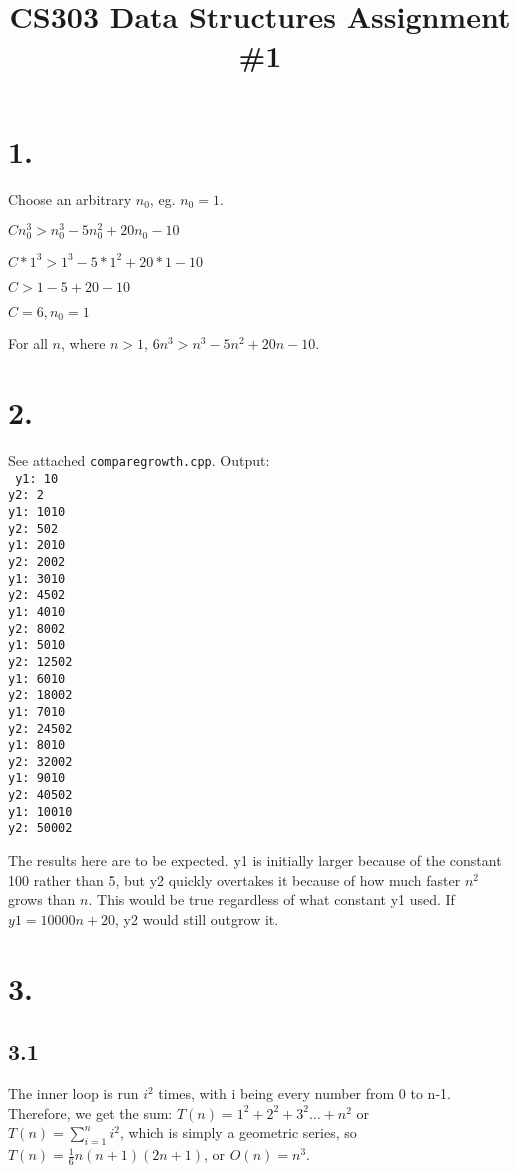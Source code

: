 \documentclass[12pt]{article}
\title{CS303 Data Structures Assignment \#1}
\begin{document}
\maketitle

\section*{1.}
{\small
Choose an arbitrary \(n_0\), eg. \(n_0=1\).

\(Cn_0^3>n_0^3-5n_0^2+20n_0-10\)

\(C*1^3>1^3-5*1^2+20*1-10\)

\(C>1-5+20-10\)

\(C=6, n_0=1\)\\
}
For all \(n\), where \(n>1\), \(6n^3>n^3-5n^2+20n-10\).\\

\section*{2.}
See attached \texttt{comparegrowth.cpp}. Output:\\
\texttt{
y1: 10\\
y2: 2\\
y1: 1010\\
y2: 502\\
y1: 2010\\
y2: 2002\\
y1: 3010\\
y2: 4502\\
y1: 4010\\
y2: 8002\\
y1: 5010\\
y2: 12502\\
y1: 6010\\
y2: 18002\\
y1: 7010\\
y2: 24502\\
y1: 8010\\
y2: 32002\\
y1: 9010\\
y2: 40502\\
y1: 10010\\
y2: 50002\\
}

The results here are to be expected. y1 is initially larger because of the constant 100 rather than 5, but y2 quickly overtakes it because of how much faster \(n^2\) grows than \(n\). This would be true regardless of what constant y1 used. If \(y1=10000n +20\), y2 would still outgrow it.\\

\section*{3.}
\subsection*{3.1}
The inner loop is run \(i^2\) times, with i being every number from 0 to n-1. Therefore, we get the sum:
\(T(n)=1^2+2^2+3^2\dots+n^2\) or\\
\(T(n)=\displaystyle\sum_{i=1}^n i^2\), which is simply a geometric series, so \(T(n)=\frac{1}{6}n(n+1)(2n+1)\), or \(O(n)=n^3\).
\end{document}
